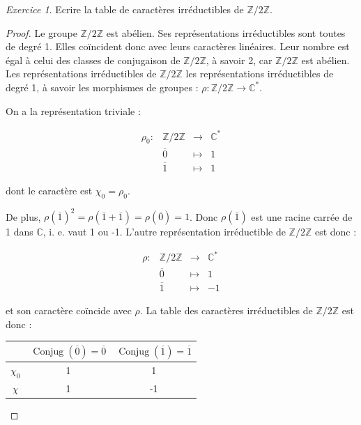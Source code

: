 \documentclass[french]{book}
\theoremstyle{definition}
\theoremstyle{remark}
\newtheorem{exo}{Exercice}
\begin{document}
\begin{exo}
  Ecrire la table de caractères irréductibles de \(\mathbb{Z}/{2}\mathbb{Z}\).
\end{exo}

\begin{proof}
  Le groupe \(\mathbb{Z}/{ 2 }\mathbb{Z}\) est abélien. Ses représentations irréductibles sont toutes de degré 1. Elles co\"incident donc avec leurs caractères linéaires. Leur nombre est égal à celui des classes de conjugaison de \(\mathbb{Z}/{ 2 }\mathbb{Z}\), à savoir 2, car \(\mathbb{Z}/{2}\mathbb{Z}\) est abélien. Les représentations irréductibles de \(\mathbb{Z}/{ 2 }\mathbb{Z}\) les représentations irréductibles de degré 1, à savoir les morphismes de groupes : \(\rho : \mathbb{Z}/{ 2 }\mathbb{Z} \longrightarrow \mathbb{C} ^{*}\).

  On a la représentation triviale :

  \[\begin{matrix}
  \rho_0 : & \mathbb{Z}/{ 2 }\mathbb{Z} & \longrightarrow & \mathbb{C} ^{*} \\
  \ & \overline{0}  & \longmapsto & 1 \\
  \ & \overline{1}  & \longmapsto & 1
  \end{matrix}\]

  dont le caractère est \(\chi_0 = \rho_0\).

  De plus, \(\rho(\overline{1})^2 = \rho(\overline{1}+ \overline{1}) = \rho(\overline{0}) = 1\). Donc \(\rho(\overline{1})\) est une racine carrée de 1 dans \(\mathbb{C}\), i. e. vaut 1 ou -1. L'autre représentation irréductible de \(\mathbb{Z}/{ 2 }\mathbb{Z}\) est donc :

  \[\begin{matrix}
  \rho : & \mathbb{Z}/{ 2 }\mathbb{Z} & \longrightarrow & \mathbb{C} ^{*} \\
  \ & \overline{0}  & \longmapsto & 1 \\
  \ & \overline{1}  & \longmapsto & -1
  \end{matrix}\]

  et son caractère co\"incide avec \(\rho\). La table des caractères irréductibles de \(\mathbb{Z}/{ 2 }\mathbb{Z}\) est donc :

  \begin{center}
    \begin{tabular}{|c|c|c|}
      \hline
      \ & $ \operatorname{Conjug}(\overline{0}) = \overline{0} $ & $ \operatorname{Conjug}(\overline{1}) = \overline{1}$ \\
      \hline
      $\chi_0$ & 1 & 1 \\
      \hline
      $\chi$ & 1 & -1 \\
      \hline
    \end{tabular}
  \end{center}


\end{proof}
\end{document}
